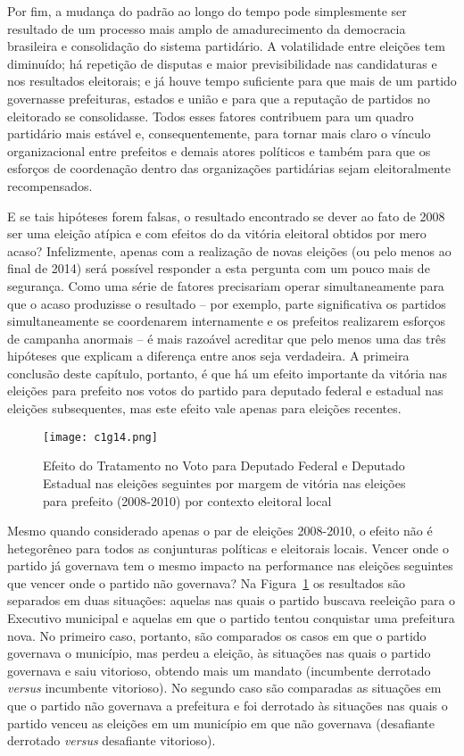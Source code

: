 Por fim, a mudança do padrão ao longo do tempo pode simplesmente ser resultado de um processo mais amplo de amadurecimento da democracia brasileira e consolidação do sistema partidário. A volatilidade entre eleições tem diminuído; há repetição de disputas e maior previsibilidade nas candidaturas e nos resultados eleitorais; e já houve tempo suficiente para que mais de um partido governasse prefeituras, estados e união e para que a reputação de partidos no eleitorado se consolidasse. Todos esses fatores contribuem para um quadro partidário mais estável e, consequentemente, para tornar mais claro o vínculo organizacional entre prefeitos e demais atores políticos e também para que os esforços de coordenação dentro das organizações partidárias sejam eleitoralmente recompensados.

E se tais hipóteses forem falsas, o resultado encontrado se dever ao fato de 2008 ser uma eleição atípica e com efeitos do da vitória eleitoral obtidos por mero acaso? Infelizmente, apenas com a realização de novas eleições (ou pelo menos ao final de 2014) será possível responder a esta pergunta com um pouco mais de segurança. Como uma série de fatores precisariam operar simultaneamente para que o acaso produzisse o resultado -- por exemplo, parte significativa os partidos simultaneamente se coordenarem internamente e os prefeitos realizarem esforços de campanha anormais -- é mais razoável acreditar que pelo menos uma das três hipóteses que explicam a diferença entre anos seja verdadeira. A primeira conclusão deste capítulo, portanto, é que há um efeito importante da vitória nas eleições para prefeito nos votos do partido para deputado federal e estadual nas eleições subsequentes, mas este efeito vale apenas para eleições recentes.

\begin{figure}[htp]
	\centering
	\texttt{[image: c1g14.png]}
	\caption{Efeito do Tratamento no Voto para Deputado Federal e Deputado Estadual nas eleições seguintes por margem de vitória nas eleições para prefeito (2008-2010) por contexto eleitoral local}
	\label{fig:c1g14} 
\end{figure}

Mesmo quando considerado apenas o par de eleições 2008-2010, o efeito não é hetegorêneo para todos as conjunturas políticas e eleitorais locais. Vencer onde o partido já governava tem o mesmo impacto na performance nas eleições seguintes que vencer onde o partido não governava?  Na Figura~\ref{fig:c1g14} os resultados são separados em duas situações: aquelas nas quais o partido buscava reeleição para o Executivo municipal e aquelas em que o partido tentou conquistar uma prefeitura nova. No primeiro caso, portanto, são comparados os casos em que o partido governava o município, mas perdeu a eleição, às situações nas quais o partido governava e saiu vitorioso, obtendo mais um mandato (incumbente derrotado \emph{versus} incumbente vitorioso). No segundo caso são comparadas as situações em que o partido não governava a prefeitura e foi derrotado às situações nas quais o partido venceu as eleições em um município em que não governava (desafiante derrotado \emph{versus} desafiante vitorioso).

